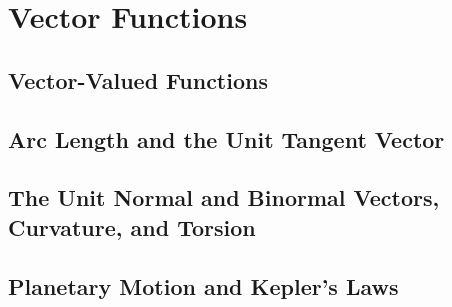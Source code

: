 \section{Vector Functions}

\subsection{Vector-Valued Functions}

\subsection{Arc Length and the Unit Tangent Vector}

\subsection{The Unit Normal and Binormal Vectors, Curvature, and Torsion}

\subsection{Planetary Motion and Kepler's Laws}